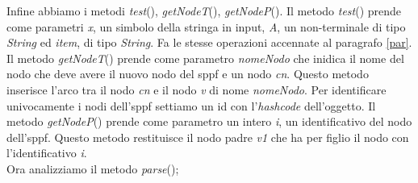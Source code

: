 Infine abbiamo i metodi \textit{test}(), \textit{getNodeT}(), \textit{getNodeP}(). Il metodo \textit{test}() prende come parametri \textit{x}, un simbolo della stringa in input, \textit{A}, un non-terminale di tipo \textit{String} ed \textit{item}, di tipo \textit{String}. Fa le stesse operazioni accennate al paragrafo \ref{par}. Il metodo \textit{getNodeT}() prende come parametro \textit{nomeNodo} che inidica il nome del nodo che deve avere il nuovo nodo del sppf e un nodo \textit{cn}. Questo metodo inserisce l'arco tra il nodo \textit{cn} e il nodo \textit{v} di nome \textit{nomeNodo}. Per identificare univocamente i nodi dell'sppf settiamo un id con l'\textit{hashcode} dell'oggetto. Il metodo \textit{getNodeP}() prende come parametro un intero \textit{i}, un identificativo del nodo dell'sppf. Questo metodo restituisce il nodo padre \textit{v1} che ha per figlio il nodo con l'identificativo \textit{i}.\\
Ora analizziamo il metodo \textit{parse}();

